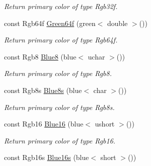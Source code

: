 \begin{DoxyCompactItemize}
\begin{DoxyCompactList}\small\item\em Return primary color of type Rgb32f. \end{DoxyCompactList}\item 
\hypertarget{group___primary_colors_gae8b15a349bc81a9b7a0e80fe118d645f}{const Rgb64f \hyperlink{group___primary_colors_gae8b15a349bc81a9b7a0e80fe118d645f}{Green64f} (green$<$ double $>$())}\label{group___primary_colors_gae8b15a349bc81a9b7a0e80fe118d645f}

\begin{DoxyCompactList}\small\item\em Return primary color of type Rgb64f. \end{DoxyCompactList}\item 
\hypertarget{group___primary_colors_gaacd658e49c7c411190797ba503bba9dd}{const Rgb8 \hyperlink{group___primary_colors_gaacd658e49c7c411190797ba503bba9dd}{Blue8} (blue$<$ uchar $>$())}\label{group___primary_colors_gaacd658e49c7c411190797ba503bba9dd}

\begin{DoxyCompactList}\small\item\em Return primary color of type Rgb8. \end{DoxyCompactList}\item 
\hypertarget{group___primary_colors_ga337cfba761649f338adce54f09cd748b}{const Rgb8s \hyperlink{group___primary_colors_ga337cfba761649f338adce54f09cd748b}{Blue8s} (blue$<$ char $>$())}\label{group___primary_colors_ga337cfba761649f338adce54f09cd748b}

\begin{DoxyCompactList}\small\item\em Return primary color of type Rgb8s. \end{DoxyCompactList}\item 
\hypertarget{group___primary_colors_gab4b0b2ae71f26139bf99c35958089743}{const Rgb16 \hyperlink{group___primary_colors_gab4b0b2ae71f26139bf99c35958089743}{Blue16} (blue$<$ ushort $>$())}\label{group___primary_colors_gab4b0b2ae71f26139bf99c35958089743}

\begin{DoxyCompactList}\small\item\em Return primary color of type Rgb16. \end{DoxyCompactList}\item 
\hypertarget{group___primary_colors_ga1c194d70f2088366be5d2c8198fbb06f}{const Rgb16s \hyperlink{group___primary_colors_ga1c194d70f2088366be5d2c8198fbb06f}{Blue16s} (blue$<$ short $>$())}\label{group___primary_colors_ga1c194d70f2088366be5d2c8198fbb06f}


\end{DoxyCompactItemize}
